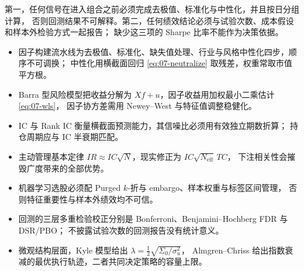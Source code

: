 \begin{keybox}
第一，任何信号在进入组合之前必须完成去极值、标准化与中性化，并且按日分组计算，
否则回测结果不可解释。第二，任何绩效结论必须与试验次数、成本假设和样本外检验方式一起报告；
缺少这三项的 Sharpe 比率不能作为决策依据。
\end{keybox}

\begin{summarybox}
\begin{itemize}[leftmargin=*]
  \item 因子构建流水线为去极值、标准化、缺失值处理、行业与风格中性化四步，顺序不可调换；
  中性化用横截面回归 \cref{eq:07-neutralize} 取残差，权重常取市值平方根。
  \item Barra 型风险模型把收益分解为 $X f + u$，因子收益用加权最小二乘估计 \cref{eq:07-wls}，
  因子协方差需用 Newey--West 与特征值调整稳健化。
  \item IC 与 Rank IC 衡量横截面预测能力，其信噪比必须用有效独立期数折算；
  持仓周期应与 IC 半衰期匹配。
  \item 主动管理基本定律 $IR \approx IC\sqrt{N}$，现实修正为 $IC\sqrt{N_{\text{eff}}}\,TC$，
  下注相关性会摧毁广度带来的全部优势。
  \item 机器学习选股必须配 Purged $k$-折与 embargo、样本权重与标签区间管理，
  否则特征重要性与样本外绩效均不可信。
  \item 回测的三层多重检验校正分别是 Bonferroni、Benjamini--Hochberg FDR 与 DSR/PBO；
  不披露试验次数的回测报告没有统计意义。
  \item 微观结构层面，Kyle 模型给出 $\lambda = \frac{1}{2}\sqrt{\Sigma_0/\sigma_u^{2}}$，
  Almgren--Chriss 给出指数衰减的最优执行轨迹，二者共同决定策略的容量上限。
\end{itemize}
\end{summarybox}

